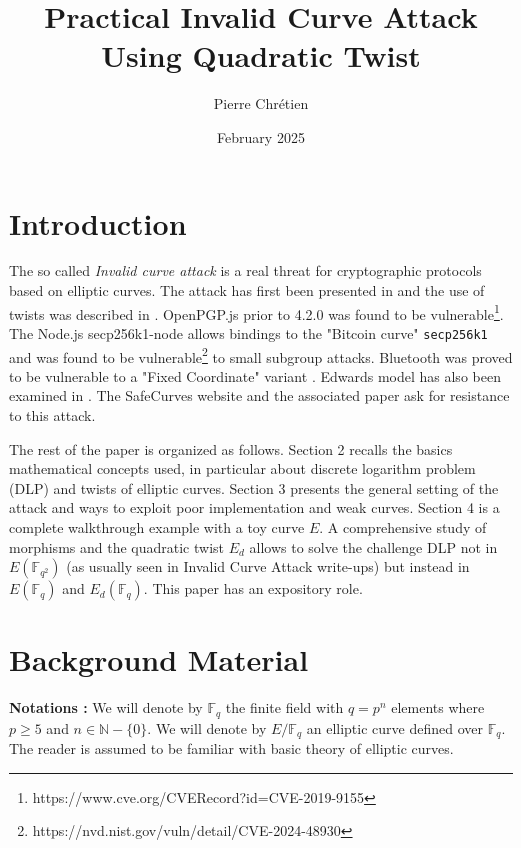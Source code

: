 \documentclass[10pt]{article}
\theoremstyle{definition}
\newcommand{\N}{\mathbb{N}}
\newcommand{\F}{\mathbb{F}}
\begin{document}

\author{Pierre Chrétien}
\title{Practical Invalid Curve Attack Using Quadratic Twist}
\date{February 2025}
\maketitle


\section{Introduction}

The so called \textsl{Invalid curve attack} is a real threat for cryptographic protocols based on elliptic curves.
The attack has first been presented in \cite{BMM00} and the use of twists was described in \cite{FLRV08}.
OpenPGP.js prior to 4.2.0 was found to be vulnerable\footnote{https://www.cve.org/CVERecord?id=CVE-2019-9155}. 
The Node.js secp256k1-node allows bindings to the  "Bitcoin curve" \verb|secp256k1| and was found to be vulnerable\footnote{https://nvd.nist.gov/vuln/detail/CVE-2024-48930} to small subgroup attacks.
Bluetooth was proved to be vulnerable to a "Fixed Coordinate" variant  \cite{cryptoeprint:2019/1043}.
Edwards model has also been examined in \cite{NT15}.
The SafeCurves website and the associated paper \cite{cryptoeprint:2024/1265} ask for resistance to this attack.


The rest of the paper is organized as follows.
Section 2 recalls the basics mathematical concepts used, in particular about discrete logarithm problem (DLP) and twists of elliptic curves. 
Section 3 presents the general setting of the attack and ways to exploit poor implementation and weak curves.
Section 4 is a complete walkthrough example with a toy curve $E$.
A comprehensive study of morphisms and the quadratic twist $E_d$ allows to solve the challenge DLP not in $E(\F_{q^2})$ (as usually seen in Invalid Curve Attack write-ups) but instead in $E(\F_{q})$ and $E_d(\F_{q})$. 
This paper has an expository role.

\section{Background Material}

\textbf{Notations :}
We will denote by $\F_q$ the finite field with $q = p^n$ elements where $p \geq 5$ and $n \in \N - \lbrace 0 \rbrace$.
We will denote by $E/\F_q$ an elliptic curve defined over $\F_q$. 
The reader is assumed to be familiar with basic theory of elliptic curves.
\end{document}
